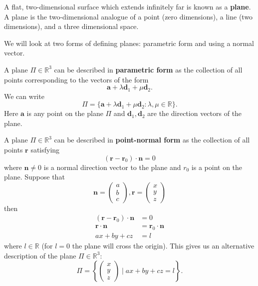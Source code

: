 \begin{definition}
    A flat, two-dimensional surface which extends infinitely far is known as a \textbf{plane}. A plane is the two-dimensional analogue of a point (zero dimensions), a line (two dimensions), and a three dimensional space.
\end{definition}

We will look at two forms of defining planes: parametric form and using a normal vector.

\begin{definition}
    A plane $\Pi\in\mathbb R^3$ can  be described in \textbf{parametric form} as the collection of all points corresponding to the vectors of the form
    \[\bm a+\lambda\bm d_1+\mu\bm d_2.\]
    We can write
    \[\Pi=\{\bm a+\lambda\bm d_1+\mu\bm d_2:\lambda,\mu\in\mathbb R\}.\]
    Here $\bm a$ is any point on the plane $\Pi$ and $\bm d_1,\bm d_2$ are the direction vectors of the plane.
\end{definition}

\begin{definition}
    A plane $\Pi\in\mathbb R^3$ can be described in \textbf{point-normal form} as the collection of all points $\bm r$ satisfying
    \[(\bm r-\bm r_0)\cdot\bm n=0\]
    where $\bm n\neq0$ is a normal direction vector to the plane and $r_0$ is a point on the plane. 
    Suppose that
    \[
        \bm n=
        \begin{pmatrix}
            a\\b\\c
        \end{pmatrix},
        \bm r=
        \begin{pmatrix}
            x\\y\\z
        \end{pmatrix}
    \]
    then
    \begin{align*}
        (\bm r-\bm r_0)\cdot\bm n&=0\\
        \bm r\cdot\bm n&=\bm r_0\cdot\bm n\\
        ax+by+cz& =l
    \end{align*}
    where $l\in\mathbb R$ (for $l=0$ the plane will cross the origin). This gives us an alternative description of the plane $\Pi\in\mathbb R^3$:
    \[
        \Pi=\left\{
            \begin{pmatrix}
                x\\y\\z
            \end{pmatrix}
            \mid ax+by+cz=l
        \right\}.
    \]
\end{definition}

